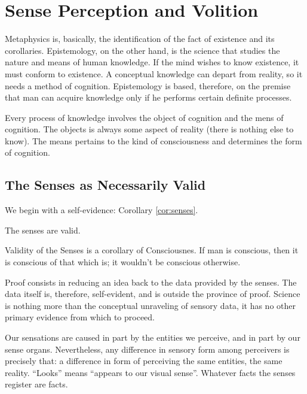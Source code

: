 \chapter{Sense Perception and Volition}

    Metaphysics is, basically, the identification of the fact of existence and its corollaries. Epistemology, on the other hand, is the science that studies the nature and means of human knowledge. If the mind wishes to know existence, it must conform to existence. A conceptual knowledge can depart from reality, so it needs a method of cognition. Epistemology is based, therefore, on the premise that man can acquire knowledge only if he performs certain definite processes.

    Every process of knowledge involves the object of cognition and the mens of cognition. The objects is always some aspect of reality (there is nothing else to know). The means pertains to the kind of consciousness and determines the form of cognition.
    
    \section{The Senses as Necessarily Valid}
    
        We begin with a self-evidence: Corollary \ref{cor:senses}.

            \begin{corollary}
            \label{cor:senses}
                The senses are valid.
            \end{corollary}

            \begin{remark}
                Validity of the Senses is a corollary of Consciousnes. If man is conscious, then it is conscious of that which is; it wouldn't be conscious otherwise.
            \end{remark}
        
        Proof consists in reducing an idea back to the data provided by the senses. The data itself is, therefore, self-evident, and is outside the province of proof. Science is nothing more than the conceptual unraveling of sensory data, it has no other primary evidence from which to proceed.
        
        Our sensations are caused in part by the entities we perceive, and in part by our sense organs. Nevertheless, any difference in sensory form among perceivers is precisely that: a difference in form of perceiving the same entities, the same reality. ``Looks'' means ``appears to our visual sense''. Whatever facts the senses register are facts.
    
